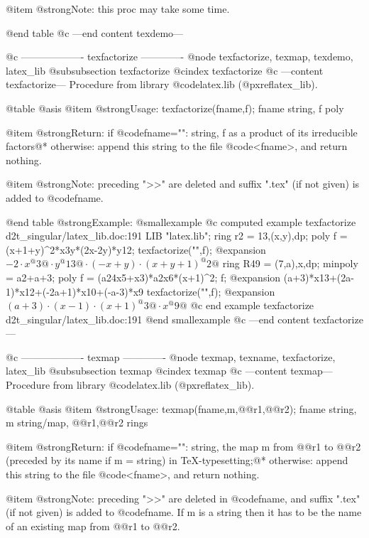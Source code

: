 {@item @strong{Note:}
this proc may take some time.

@end table
@c ---end content texdemo---

@c ------------------- texfactorize -------------
@node texfactorize, texmap, texdemo, latex_lib
@subsubsection texfactorize
@cindex texfactorize
@c ---content texfactorize---
Procedure from library @code{latex.lib} (@pxref{latex_lib}).

@table @asis
@item @strong{Usage:}
texfactorize(fname,f); fname string, f poly

@item @strong{Return:}
if @code{fname=""}: string, f as a product of its irreducible
factors@*
otherwise: append this string to the file @code{<fname>}, and
return nothing.

@item @strong{Note:}
preceding ">>" are deleted and suffix ".tex" (if not given)
is added to @code{fname}.

@end table
@strong{Example:}
@smallexample
@c computed example texfactorize d2t_singular/latex_lib.doc:191 
LIB "latex.lib";
ring r2 = 13,(x,y),dp;
poly f = (x+1+y)^2*x3y*(2x-2y)*y12;
texfactorize("",f);
@expansion{} $-2\cdot x^@{3@}\cdot y^@{13@}\cdot (-x+y)\cdot (x+y+1)^@{2@}$
ring R49 = (7,a),x,dp;
minpoly = a2+a+3;
poly f = (a24x5+x3)*a2x6*(x+1)^2;
f;
@expansion{} (a+3)*x13+(2a-1)*x12+(-2a+1)*x10+(-a-3)*x9
texfactorize("",f);
@expansion{} $(a+3)\cdot (x-1)\cdot (x+1)^@{3@}\cdot x^@{9@}$
@c end example texfactorize d2t_singular/latex_lib.doc:191
@end smallexample
@c ---end content texfactorize---

@c ------------------- texmap -------------
@node texmap, texname, texfactorize, latex_lib
@subsubsection texmap
@cindex texmap
@c ---content texmap---
Procedure from library @code{latex.lib} (@pxref{latex_lib}).

@table @asis
@item @strong{Usage:}
texmap(fname,m,@@r1,@@r2); fname string, m string/map, @@r1,@@r2 rings

@item @strong{Return:}
if @code{fname=""}: string, the map m from @@r1 to @@r2 (preceded
by its name if m = string) in TeX-typesetting;@*
otherwise: append this string to the file @code{<fname>}, and
return nothing.

@item @strong{Note:}
preceding ">>" are deleted in @code{fname}, and suffix ".tex"
(if not given) is added to @code{fname}.
If m is a string then it has to be the name of an existing map
from @@r1 to @@r2.

}
